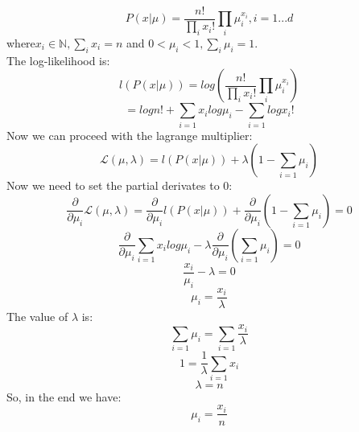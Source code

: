 \begin{equation*}
	P(x|\mu) = \frac{n!}{\prod_ix_i!}\prod_i\mu_i^{x_i} , i = 1...d
\end{equation*}
where$ x_i \in \mathbb{N}, \sum_{i}x_i = n$ and $0 < \mu_i < 1, \sum_{i}\mu_i = 1$.\\
The log-likelihood is:
\begin{equation*}
	l(P(x|\mu)) = log(\frac{n!}{\prod_ix_i!}\prod_i\mu_i^{x_i} )
\end{equation*}
\begin{equation*}
	= logn!  + \sum_{i=1}x_ilog\mu_i - \sum_{i=1}logx_i!
\end{equation*}
Now we can proceed with the lagrange multiplier:
\begin{equation*}
	\mathcal{L}(\mu,\lambda) = l(P(x|\mu)) + \lambda(1 - \sum_{i=1}\mu_i)
\end{equation*}
Now we need to set the partial derivates to 0:
\begin{equation*}
	\frac{\partial}{\partial\mu_i}\mathcal{L}(\mu,\lambda) =  \frac{\partial}{\partial\mu_i}  l(P(x|\mu)) + \frac{\partial}{\partial\mu_i}(1 - \sum_{i=1}\mu_i) = 0
\end{equation*}
\begin{equation*}
	\frac{\partial}{\partial\mu_i} \sum_{i=1}x_ilog\mu_i -\lambda \frac{\partial}{\partial\mu_i}(\sum_{i=1}\mu_i) = 0
\end{equation*}
\begin{equation*}
	\frac{x_i}{\mu_i} - \lambda = 0 
\end{equation*}
\begin{equation*}
	\mu_i = \frac{x_i}{\lambda}
\end{equation*}
The value of $\lambda$ is:
\begin{equation*}
	\sum_{i=1}\mu_i = \sum_{i=1}\frac{x_i}{\lambda}
\end{equation*}
\begin{equation*}
	1 = \frac{1}{\lambda} \sum_{i = 1}x_i
\end{equation*}
\begin{equation*}
	\lambda = n
\end{equation*}
So, in the end we have:
\begin{equation*}
	\mu_i = \frac{x_i}{n}
\end{equation*}